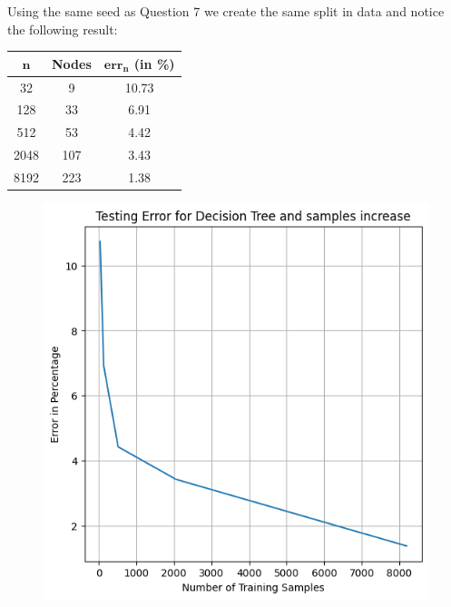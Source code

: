 \documentclass[a4paper]{article}
\theoremstyle{definition}
\newenvironment{soln}{
    \leavevmode\color{blue}\ignorespaces
}{}
\begin{document}
\begin{soln}
    Using the same seed as Question 7 we create the same split in data and notice the following result:\\
    \begin{minipage}{0.4\linewidth}
        \centering
        \begin{tabular}{|c|c|c|}
              \hline
              $\mathbf{n}$ & \textbf{Nodes} & $\mathbf{err_n }$ (in \%) \\
              \hline
              32 & 9 & 10.73 \\
              128 & 33 & 6.91 \\
              512 & 53 & 4.42 \\
              2048 & 107 & 3.43 \\
              8192 & 223 & 1.38 \\
              \hline
          \end{tabular}
    \end{minipage}
    \begin{minipage}{0.6\linewidth}
        \begin{figure}[H]
            \centering
            \includegraphics[scale=0.4]{Images/DTsk_error.png}
            \label{fig:qsk_error}
        \end{figure}
    \end{minipage}
\end{soln}
\end{document}
